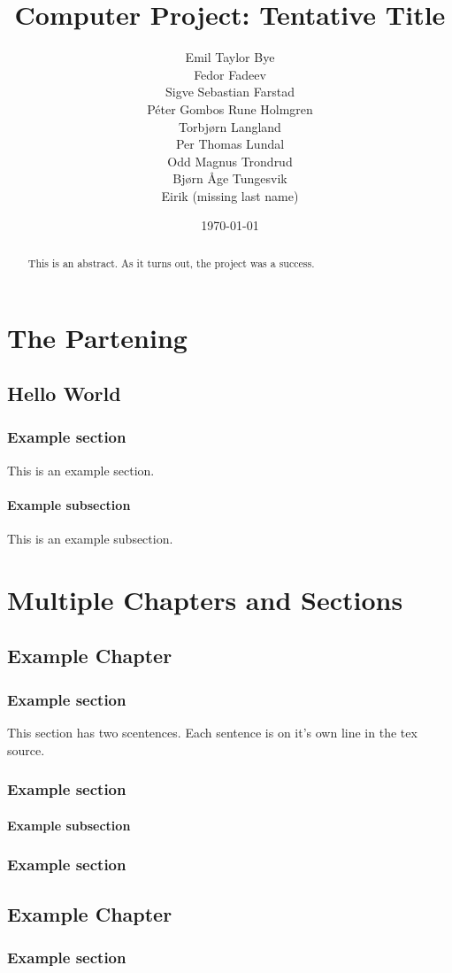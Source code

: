 \documentclass{report}
\title{Computer Project: Tentative Title}
\date{\today}
\author{Emil Taylor Bye
     \\ Fedor Fadeev
     \\ Sigve Sebastian Farstad
     \\ Péter Gombos Rune Holmgren
     \\ Torbjørn Langland
     \\ Per Thomas Lundal
     \\ Odd Magnus Trondrud
     \\ Bjørn Åge Tungesvik
     \\ Eirik (missing last name)
}
\begin{document}
\maketitle

\begin{abstract}
This is an abstract.
As it turns out, the project was a success.
\end{abstract}

\tableofcontents

\part{The Partening}

\chapter{Hello World}

\section{Example section}

This is an example section.

\subsection{Example subsection}

This is an example subsection.

\part{Multiple Chapters and Sections}

\chapter{Example Chapter}

\section{Example section}

This section has two scentences.
Each sentence is on it's own line in the tex source.

\section{Example section}

\subsection{Example subsection}

\section{Example section}

\chapter{Example Chapter}

\section{Example section}
\end{document}
